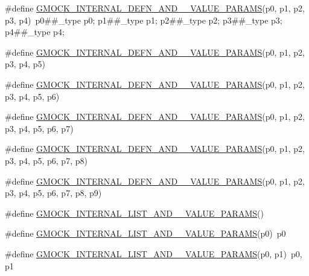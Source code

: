 \begin{DoxyCompactItemize}
\item 
\#define \mbox{\hyperlink{gmock-generated-actions_8h_ae8e67227205c5f57cbe9c885271d8f82}{G\+M\+O\+C\+K\+\_\+\+I\+N\+T\+E\+R\+N\+A\+L\+\_\+\+D\+E\+F\+N\+\_\+\+A\+N\+D\+\_\+\_\+\+V\+A\+L\+U\+E\+\_\+\+P\+A\+R\+A\+MS}}(p0,  p1,  p2,  p3,  p4)~p0\#\#\+\_\+type p0; p1\#\#\+\_\+type p1; p2\#\#\+\_\+type p2; p3\#\#\+\_\+type p3; p4\#\#\+\_\+type p4;
\item 
\#define \mbox{\hyperlink{gmock-generated-actions_8h_a4ba5920542abfa689a6517d21eb8860a}{G\+M\+O\+C\+K\+\_\+\+I\+N\+T\+E\+R\+N\+A\+L\+\_\+\+D\+E\+F\+N\+\_\+\+A\+N\+D\+\_\+\_\+\+V\+A\+L\+U\+E\+\_\+\+P\+A\+R\+A\+MS}}(p0,  p1,  p2,  p3,  p4,  p5)
\item 
\#define \mbox{\hyperlink{gmock-generated-actions_8h_aa0f3292bceb484af4271eb50de9d5ead}{G\+M\+O\+C\+K\+\_\+\+I\+N\+T\+E\+R\+N\+A\+L\+\_\+\+D\+E\+F\+N\+\_\+\+A\+N\+D\+\_\+\_\+\+V\+A\+L\+U\+E\+\_\+\+P\+A\+R\+A\+MS}}(p0,  p1,  p2,  p3,  p4,  p5,  p6)
\item 
\#define \mbox{\hyperlink{gmock-generated-actions_8h_a028ed15e5ba3301a85b859792e9fb7c9}{G\+M\+O\+C\+K\+\_\+\+I\+N\+T\+E\+R\+N\+A\+L\+\_\+\+D\+E\+F\+N\+\_\+\+A\+N\+D\+\_\+\_\+\+V\+A\+L\+U\+E\+\_\+\+P\+A\+R\+A\+MS}}(p0,  p1,  p2,  p3,  p4,  p5,  p6,  p7)
\item 
\#define \mbox{\hyperlink{gmock-generated-actions_8h_a9565bbd3c2624487ccb71f325fd96596}{G\+M\+O\+C\+K\+\_\+\+I\+N\+T\+E\+R\+N\+A\+L\+\_\+\+D\+E\+F\+N\+\_\+\+A\+N\+D\+\_\+\_\+\+V\+A\+L\+U\+E\+\_\+\+P\+A\+R\+A\+MS}}(p0,  p1,  p2,  p3,  p4,  p5,  p6,  p7,  p8)
\item 
\#define \mbox{\hyperlink{gmock-generated-actions_8h_aea3f6f518db8ecc3b63341f38a7c4eaf}{G\+M\+O\+C\+K\+\_\+\+I\+N\+T\+E\+R\+N\+A\+L\+\_\+\+D\+E\+F\+N\+\_\+\+A\+N\+D\+\_\+\_\+\+V\+A\+L\+U\+E\+\_\+\+P\+A\+R\+A\+MS}}(p0,  p1,  p2,  p3,  p4,  p5,  p6,  p7,  p8,  p9)
\item 
\#define \mbox{\hyperlink{gmock-generated-actions_8h_a2dbeccb9f6d632f5e7e2c1421cd549aa}{G\+M\+O\+C\+K\+\_\+\+I\+N\+T\+E\+R\+N\+A\+L\+\_\+\+L\+I\+S\+T\+\_\+\+A\+N\+D\+\_\+\_\+\+V\+A\+L\+U\+E\+\_\+\+P\+A\+R\+A\+MS}}()
\item 
\#define \mbox{\hyperlink{gmock-generated-actions_8h_a12895511e72c47c78850542b68fe83d4}{G\+M\+O\+C\+K\+\_\+\+I\+N\+T\+E\+R\+N\+A\+L\+\_\+\+L\+I\+S\+T\+\_\+\+A\+N\+D\+\_\+\_\+\+V\+A\+L\+U\+E\+\_\+\+P\+A\+R\+A\+MS}}(p0)~p0
\item 
\#define \mbox{\hyperlink{gmock-generated-actions_8h_ac0efec20319ea66c5508b6e5ad42c357}{G\+M\+O\+C\+K\+\_\+\+I\+N\+T\+E\+R\+N\+A\+L\+\_\+\+L\+I\+S\+T\+\_\+\+A\+N\+D\+\_\+\_\+\+V\+A\+L\+U\+E\+\_\+\+P\+A\+R\+A\+MS}}(p0,  p1)~p0, p1

\end{DoxyCompactItemize}
